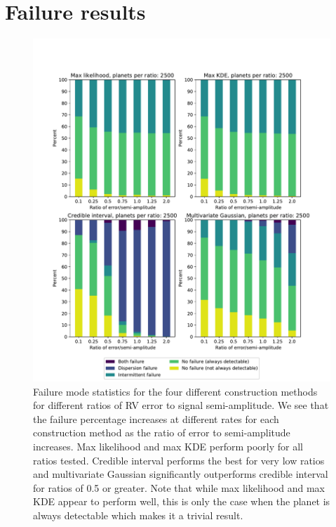 \section{Failure results}%
\label{sec:failure_results}
\begin{figure}[htpb]
    \centering
    \includegraphics[width=\linewidth]{ch1/figures/construction_method_bars_including_always_detectable.pdf}
    \caption{Failure mode statistics for the four different construction methods for different
        ratios of RV error to signal semi-amplitude. We see that the failure percentage increases at
        different rates for each construction method as the ratio of error to semi-amplitude
        increases. Max likelihood and max KDE perform poorly for all ratios tested.  Credible
        interval performs the best for very low ratios and multivariate Gaussian significantly
        outperforms credible interval for ratios of 0.5 or greater. Note that while max likelihood
        and max KDE appear to perform well, this is only the case when the planet is always detectable
        which makes it a trivial result.}%
    \label{fig:con_method_bar_comparison}
\end{figure}
